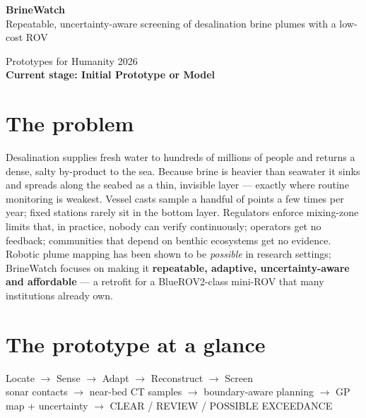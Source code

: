 \documentclass[10pt,a4paper]{article}
\newcommand{\stagebox}[1]{\colorbox{deepblue!10}{\sffamily\small\textbf{#1}}}
\begin{document}
\begin{minipage}[b]{0.70\textwidth}
  {\sffamily\bfseries\fontsize{22}{24}\selectfont\color{deepblue} BrineWatch}\\[3pt]
  {\sffamily\large Repeatable, uncertainty-aware screening of desalination
  brine plumes with a low-cost ROV}
\end{minipage}\hfill
\begin{minipage}[b]{0.28\textwidth}\raggedleft
  {\sffamily\small Prototypes for Humanity 2026\\[1pt]
  \stagebox{Current stage: Initial Prototype or Model}}
\end{minipage}

\vspace{4pt}

\section{The problem}
Desalination supplies fresh water to hundreds of millions of people and
returns a dense, salty by-product to the sea. Because brine is heavier than
seawater it sinks and spreads along the seabed as a thin, invisible layer —
exactly where routine monitoring is weakest. Vessel casts sample a handful
of points a few times per year; fixed stations rarely sit in the bottom
layer. Regulators enforce mixing-zone limits that, in practice, nobody can
verify continuously; operators get no feedback; communities that depend on
benthic ecosystems get no evidence. Robotic plume mapping has been shown to
be \emph{possible} in research settings; BrineWatch focuses on making it
\textbf{repeatable, adaptive, uncertainty-aware and affordable} — a retrofit
for a BlueROV2-class mini-ROV that many institutions already own.

\section{The prototype at a glance}
\begin{center}
\sffamily\small
Locate \;$\rightarrow$\; Sense \;$\rightarrow$\; Adapt \;$\rightarrow$\;
Reconstruct \;$\rightarrow$\; Screen\\[2pt]
{\footnotesize sonar contacts $\rightarrow$ near-bed CT samples
$\rightarrow$ boundary-aware planning $\rightarrow$ GP map + uncertainty
$\rightarrow$ CLEAR / REVIEW / POSSIBLE EXCEEDANCE}
\end{center}
\end{document}
